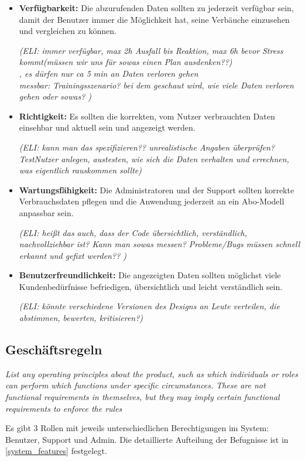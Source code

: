 \begin{itemize}
    \item \textbf{Verfügbarkeit: }
    Die abzurufenden Daten sollten zu jederzeit verfügbar sein,
    damit der Benutzer immer die Möglichkeit hat, 
    seine Verbäuche einzusehen und vergleichen zu können.
    
    \textit{(ELI: immer verfügbar, max 2h Ausfall bis Reaktion, 
    max 6h bevor Stress kommt(müssen wir uns für sowas einen Plan ausdenken??)\\,
    es dürfen nur ca 5 min an Daten verloren gehen\\
    messbar: Trainingsszenario? bei dem geschaut wird, 
    wie viele Daten verloren gehen oder sowas? )}
    
    \item \textbf{Richtigkeit: }
    Es sollten die korrekten, 
    vom Nutzer verbrauchten Daten einsehbar und 
    aktuell sein und angezeigt werden.

\textit{(ELI: kann man das spezifizieren?? unrealistische Angaben überprüfen?
\\TestNutzer anlegen, austesten, 
    wie sich die Daten verhalten und errechnen, 
    was eigentlich rauskommen sollte)}
    \item \textbf{Wartungsfähigkeit: }
    Die Administratoren und der Support sollten korrekte Verbrauchsdaten 
    pflegen und die Anwendung jederzeit an ein Abo-Modell anpassbar sein.

    \textit{(ELI: heißt das auch, dass der Code übersichtlich, verständlich, 
    nachvollziehbar ist? Kann man sowas messen?
    Probleme/Bugs müssen schnell erkannt und gefixt werden?? )}

    \item \textbf{Benutzerfreundlichkeit: }
    Die angezeigten Daten sollten möglichst viele Kundenbedürfnisse 
    befriedigen, übersichtlich und leicht verständlich sein.

    \textit{(ELI: könnte verschiedene Versionen des Designs an 
    Leute verteilen, die abstimmen, bewerten, kritisieren?)}
\end{itemize}

\subsection{Geschäftsregeln}
\textit{List any operating principles about the product, 
such as which individuals or roles can perform which functions under specific circumstances. 
These are not functional requirements in themselves, 
but they may imply certain functional requirements to enforce the rules}

    Es gibt 3 Rollen mit jeweils unterschiedlichen Berechtigungen im System: Benutzer, Support und Admin. Die detaillierte Aufteilung der Befugnisse ist in \ref{system_features} festgelegt.
